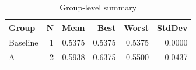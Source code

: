 \begin{table}[htbp]
\centering
\caption{Group-level summary}
\label{tab:group-summary}
\begin{tabular}{lrrrrr}
\toprule
\textbf{Group} & \textbf{N} & \textbf{Mean} & \textbf{Best} & \textbf{Worst} & \textbf{StdDev} \\
\midrule
Baseline & 1 & 0.5375 & 0.5375 & 0.5375 & 0.0000 \\
A & 2 & 0.5938 & 0.6375 & 0.5500 & 0.0437 \\
\bottomrule
\end{tabular}
\end{table}